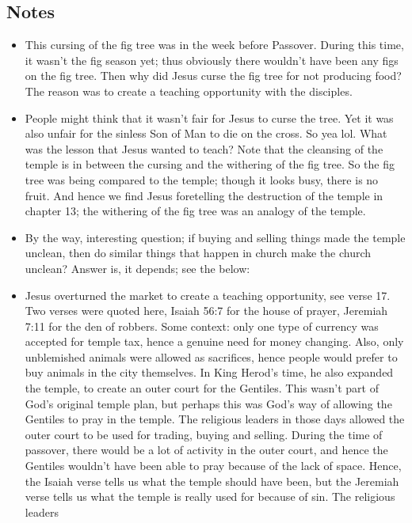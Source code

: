 \subsection*{Notes}
\begin{itemize}
  \item{This cursing of the fig tree was in the week before Passover.  During
  this time, it wasn't the fig season yet; thus obviously there wouldn't have
  been any figs on the fig tree.  Then why did Jesus curse the fig tree for
  not producing food?  The reason was to create a teaching opportunity with
  the disciples.}
  \item{People might think that it wasn't fair for Jesus to curse the tree.
  Yet it was also unfair for the sinless Son of Man to die on the cross.  So
  yea lol.  What was the lesson that Jesus wanted to teach?  Note that the
  cleansing of the temple is in between the cursing and the withering of the
  fig tree.  So the fig tree was being compared to the temple; though it
  looks busy, there is no fruit.  And hence we find Jesus foretelling the
  destruction of the temple in chapter 13; the withering of the fig tree was
  an analogy of the temple.}
  \item{By the way, interesting question; if buying and selling things made
  the temple unclean, then do similar things that happen in church make the
  church unclean? Answer is, it depends; see the below:}
  \item{Jesus overturned the market to create a teaching opportunity, see
  verse 17.  Two verses were quoted here, Isaiah 56:7 for the house of
  prayer, Jeremiah 7:11 for the den of robbers.  Some context: only one type
  of currency was accepted for temple tax, hence a genuine need for money
  changing.  Also, only unblemished animals were allowed as sacrifices, hence
  people would prefer to buy animals in the city themselves.  In King Herod's
  time, he also expanded the temple, to create an outer court for the
  Gentiles.  This wasn't part of God's original temple plan, but perhaps this
  was God's way of allowing the Gentiles to pray in the temple.  The
  religious leaders in those days allowed the outer court to be used for
  trading, buying and selling.  During the time of passover, there would be a
  lot of activity in the outer court, and hence the Gentiles wouldn't have
  been able to pray because of the lack of space.  Hence, the Isaiah verse
  tells us what the temple should have been, but the Jeremiah verse tells us
  what the temple is really used for because of sin.  The religious leaders
}
\end{itemize}
